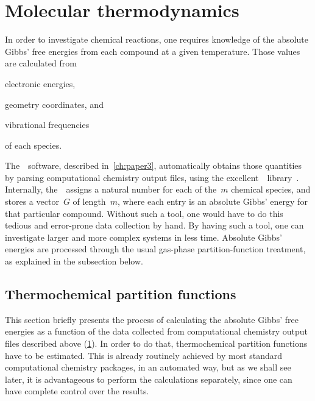 \section{Molecular thermodynamics}%
\label{sec:mol-thermo}

In order to investigate chemical reactions,
one requires knowledge of the absolute Gibbs' free energies from each compound at a given temperature.
Those values are calculated from
\begin{enumerate*}
	\item electronic energies,
	\item geometry coordinates,
	      and
	\item vibrational frequencies
\end{enumerate*}
of each species.

The~\overreact{}~software,
described in~\cref{ch:paper3},
automatically obtains those quantities
by parsing computational chemistry output files,
using the excellent~\cclib{}~library~\cite{O_boyle_2008}.
Internally,
the~\overreact{}~assigns a natural number for each of the~$m$ chemical species,
and stores a vector~$G$ of length~$m$,
where each entry is an absolute Gibbs' energy for that particular compound.
Without such a tool,
one would have to do this tedious and error-prone data collection by hand.
By having such a tool,
one can investigate larger and more complex systems in less time.
Absolute Gibbs' energies are processed through the usual gas-phase partition-function treatment,
as explained in the subsection below.

\subsection{Thermochemical partition functions}%
\label{sec:rrho}

This section briefly presents the process of calculating
the absolute Gibbs' free energies as a function of the data collected
from computational chemistry output files described above (\cref{sec:mol-thermo}).
In order to do that,
thermochemical partition
functions have to be estimated.
This is already routinely achieved by most standard computational chemistry packages,
in an automated way,
but as we shall see later,
it is advantageous to perform
the calculations separately,
since one can have complete control over the results.

